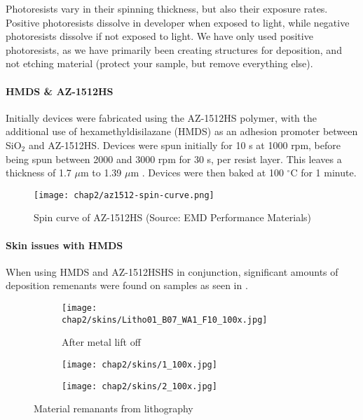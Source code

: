 \documentclass[../../Matt_Gebert_Honours_Thesis.tex]{subfiles}
\begin{document}
	Photoresists vary in their spinning thickness, but also their exposure rates. Positive photoresists dissolve in developer when exposed to light, while negative photoresists dissolve if not exposed to light. We have only used positive photoresists, as we have primarily been creating structures for deposition, and not etching material (protect your sample, but remove everything else).
	
	\paragraph{HMDS \& AZ-1512HS}
	Initially devices were fabricated using the AZ-1512HS polymer, with the additional use of hexamethyldisilazane (HMDS) as an adhesion promoter between SiO$_2$ and AZ-1512HS. Devices were spun initially for 10 s at 1000 rpm, before being spun between 2000 and 3000 rpm for 30 s, per resist layer. This leaves a thickness of 1.7 $\mu$m to 1.39 $\mu$m \cite{az1500_series}.
	Devices were then baked at 100 $^\circ$C for 1 minute.
	
	\begin{figure}[H]\label{fig:spin_curve_AZ-1512HS}
		\centering
				\texttt{[image: chap2/az1512-spin-curve.png]}
		\caption{Spin curve of AZ-1512HS (Source: EMD Performance Materials\cite{az1500_series_spincurve})}
	\end{figure}
	
	\paragraph{Skin issues with HMDS}\label{sec:sin_issues}
	When using HMDS and AZ-1512HSHS in conjunction, significant amounts of deposition remenants were found on samples as seen in .%
	
	\begin{figure}[H]
		\centering
		\begin{subfigure}[b]{0.3\textwidth}
						\texttt{[image: chap2/skins/Litho01\_B07\_WA1\_F10\_100x.jpg]}
			\caption{After metal lift off}			
		\end{subfigure}
		\begin{subfigure}[b]{0.3\textwidth}
						\texttt{[image: chap2/skins/1\_100x.jpg]}
		\end{subfigure}
		\begin{subfigure}[b]{0.3\textwidth}
						\texttt{[image: chap2/skins/2\_100x.jpg]}
		\end{subfigure}
		\caption{Material remanants from lithography}\label{fig:lithography_skins}
	\end{figure}
	
\end{document}
